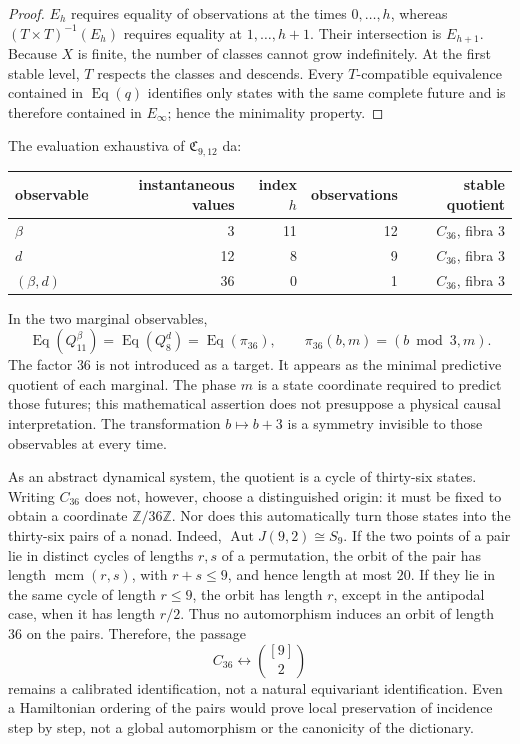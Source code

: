 \begin{proof}
\(E_h\) requires equality of observations at the times \(0,\ldots,h\), whereas
\((T\times T)^{-1}(E_h)\) requires equality at \(1,\ldots,h+1\). Their intersection is
\(E_{h+1}\). Because \(X\) is finite, the number of classes cannot grow
indefinitely. At the first stable level, \(T\) respects the classes and
descends. Every \(T\)-compatible equivalence contained in
\(\operatorname{Eq}(q)\)
identifies only states with the same complete future and is therefore
contained in \(E_\infty\); hence the minimality property.
\end{proof}

The evaluation exhaustiva of \(\mathfrak C_{9,12}\) da:
\begin{center}
\small
\begin{tabular}{@{}lrrrr@{}}
\toprule
observable & instantaneous values & index \(h\) & observations & stable quotient\\
\midrule
\(\beta\) & 3 & 11 & 12 & \(C_{36}\), fibra 3\\
\(d\) & 12 & 8 & 9 & \(C_{36}\), fibra 3\\
\((\beta,d)\) & 36 & 0 & 1 & \(C_{36}\), fibra 3\\
\bottomrule
\end{tabular}
\end{center}
In the two marginal observables,
\[
\operatorname{Eq}(Q_{11}^{\beta})
=\operatorname{Eq}(Q_8^d)
=\operatorname{Eq}(\pi_{36}),
\qquad
\pi_{36}(b,m)=(b\bmod3,m).
\]
The factor \(36\) is not introduced as a target. It appears as the minimal predictive quotient of each marginal. The phase \(m\) is a state coordinate required to predict those futures; this mathematical assertion does not presuppose a physical causal interpretation. The transformation \(b\mapsto b+3\) is a symmetry invisible to those observables at every time.

As an abstract dynamical system, the quotient is a cycle of thirty-six states. Writing \(C_{36}\) does not, however, choose a distinguished origin: it must be fixed to obtain a coordinate \(\mathbb Z/36\mathbb Z\). Nor does this automatically turn those states into the thirty-six pairs of a nonad. Indeed, \(\operatorname{Aut}J(9,2)\cong S_9\). If the two points of a pair lie in distinct cycles of lengths \(r,s\) of a permutation, the orbit of the pair has length \(\operatorname{mcm}(r,s)\), with \(r+s\leq9\), and hence length at most \(20\). If they lie in the same cycle of length \(r\leq9\), the orbit has length \(r\), except in the antipodal case, when it has length \(r/2\). Thus no automorphism induces an orbit of length \(36\) on the pairs. Therefore, the passage
\[
C_{36}\longleftrightarrow \binom{[9]}2
\]
remains a calibrated identification, not a natural equivariant identification.
Even a Hamiltonian ordering of the pairs would prove local preservation
of incidence step by step, not a global automorphism or the canonicity of the
dictionary.

